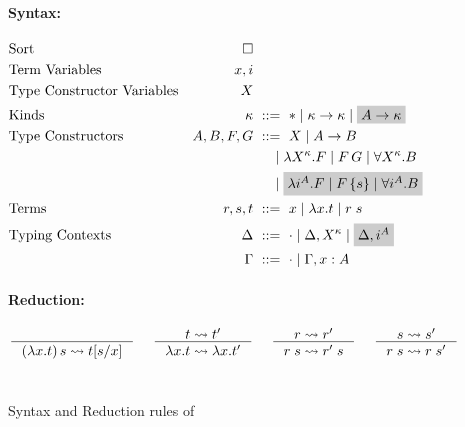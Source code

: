 \begin{figure}\begin{singlespace}
	\small
\paragraph{Syntax:}
\begin{align*}
\!\!\!\!\!\!\!\!&\text{Sort}
 	& \square
	\\
\!\!\!\!\!\!\!\!&\text{Term Variables}
 	& x,i
\\
\!\!\!\!\!\!\!\!&\text{Type Constructor Variables}
 	& X
\\
\!\!\!\!\!\!\!\!&\text{Kinds}
 	& \kappa		&~ ::= ~ *
				\mid \kappa -> \kappa
				\mid \newFi{A -> \kappa}
\\
\!\!\!\!\!\!\!\!&\text{Type Constructors}
	& A,B,F,G		&~ ::= ~ X
				\mid A -> B \\ &&& ~\quad
				\mid \lambda X^\kappa.F
				\mid F\,G
				\mid \forall X^\kappa . B \\ &&& ~\quad
				\mid \newFi{\lambda i^A.F
				\mid F\,\{s\}
				\mid \forall i^A . B}
\\
\!\!\!\!\!\!\!\!&\text{Terms}
	& r,s,t			&~ ::= ~ x \mid \lambda x.t \mid r\;s
\\
\!\!\!\!\!\!\!\!&\text{Typing Contexts}
	& \Delta		&~ ::= ~ \cdot
				\mid \Delta, X^\kappa
				\mid \newFi{\Delta, i^A} \\
&	& \Gamma		&~ ::= ~ \cdot
				\mid \Gamma, x : A
\end{align*}
\paragraph{Reduction:} 
\[ 
   \inference{}{(\lambda x.t)\,s \rightsquigarrow t[s/x]}
 ~~~~
   \inference{t \rightsquigarrow t'}{\lambda x.t \rightsquigarrow \lambda x.t'}
 ~~~~
   \inference{r \rightsquigarrow r'}{r\;s \rightsquigarrow r'\;s}
 ~~~~
   \inference{s \rightsquigarrow s'}{r\;s \rightsquigarrow r\;s'}
\]
~\\
\end{singlespace}
\caption{Syntax and Reduction rules of \Fi}
\label{fig:Fi}
\end{figure}

